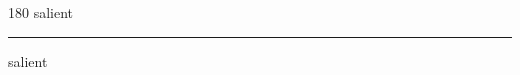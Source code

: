 
\begin{frame}
\begin{center}
\begin{turn}{180}
{\fontsize{2.5cm}{1em}\selectfont salient}
\end{turn}
\vspace{1em}\par  
\hrule
\vspace{1em}\par  
{\fontsize{2.5cm}{1em}\selectfont salient}
\end{center}
\end{frame}
